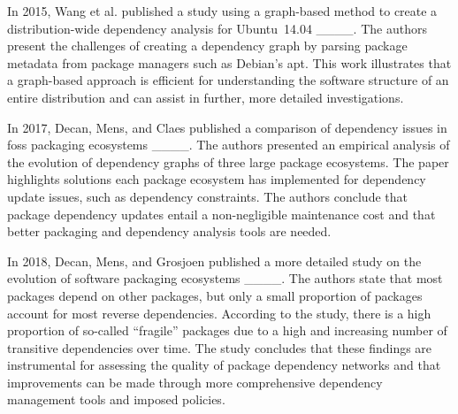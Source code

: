 In 2015, Wang et al. published a study using a graph-based method to create a distribution-wide dependency analysis for Ubuntu~14.04 ____.
The authors present the challenges of creating a dependency graph by parsing package metadata from package managers such as Debian's \gls{apt}.
This work illustrates that a graph-based approach is efficient for understanding the software structure of an entire distribution and can assist in further, more detailed investigations.


In 2017, Decan, Mens, and Claes published a comparison of dependency issues in \gls{foss} packaging ecosystems ____.
The authors presented an empirical analysis of the evolution of dependency graphs of three large package ecosystems.
The paper highlights solutions each package ecosystem has implemented for dependency update issues, such as dependency constraints.
The authors conclude that package dependency updates entail a non-negligible maintenance cost and that better packaging and dependency analysis tools are needed.


In 2018, Decan, Mens, and Grosjoen published a more detailed study on the evolution of software packaging ecosystems ____.
The authors state that most packages depend on other packages, but only a small proportion of packages account for most reverse dependencies.
According to the study, there is a high proportion of so-called “fragile” packages due to a high and increasing number of transitive dependencies over time.
The study concludes that these findings are instrumental for assessing the quality of package dependency networks and that improvements can be made through more comprehensive dependency management tools and imposed policies.

